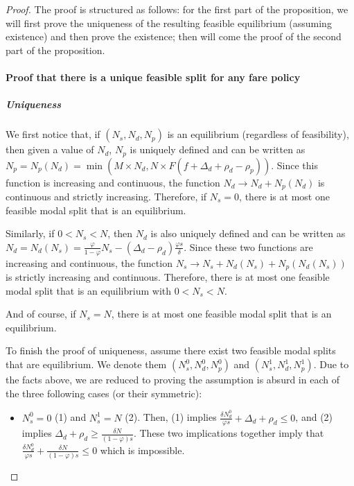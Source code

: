 \documentclass[english, a4paper]{article}
\theoremstyle{plain}
\theoremstyle{definition}
\theoremstyle{remark}
\begin{document}
\begin{proof}
    The proof is structured as follows: for the first part of the proposition, we will first prove the uniqueness of the resulting feasible equilibrium (assuming existence) and then prove the existence; then will come the proof of the second part of the proposition.

    \item \paragraph{Proof that there is a unique feasible split for any fare policy}
    \item \subparagraph{Uniqueness}
    We first notice that, if $(N_s, N_d, N_p)$ is an equilibrium (regardless of feasibility), then given a value of $N_d$, $N_p$ is uniquely defined and can be written as $N_p = N_p(N_d) = \min (M\times N_d, N \times F(f + \Delta _d + \rho _d - \rho _p))$\footnotemark. Since this function is increasing and continuous, the function $N_d \longrightarrow N_d + N_p(N_d)$ is continuous and strictly increasing. Therefore, if $N_s = 0$, there is at most one feasible modal split that is an equilibrium.
    
    Similarly, if $0 < N_s < N$, then $N_d$ is also uniquely defined and can be written as $N_d = N_d (N_s) = \frac{\varphi}{1-\varphi}N_s - (\Delta _d - \rho _d)\frac{\varphi s}{\delta}$. Since these two functions are increasing and continuous, the function $N_s \longrightarrow N_s + N_d(N_s) + N_p(N_d(N_s))$ is strictly increasing and continuous. Therefore, there is at most one feasible modal split that is an equilibrium with $0 < N_s < N$.

    And of course, if $N_s = N$, there is at most one feasible modal split that is an equilibrium.
    

    To finish the proof of uniqueness, assume there exist two feasible modal splits that are equilibrium. We denote them $(N_s^0, N_d^0, N_p^0)$ and $(N_s^1, N_d^1, N_p^1)$. Due to the facts above, we are reduced to proving the assumption is absurd in each of the three following cases (or their symmetric):
    \begin{itemize}
        \item $N_s^0 = 0$ (1) and $N_s^1= N$ (2). Then, (1) implies $\frac{\delta N_d^0}{\varphi s} + \Delta _d + \rho _d \leq 0$, and (2) implies $\Delta _d + \rho _d \geq \frac{\delta N}{(1-\varphi)s}$. These two implications together imply that $\frac{\delta N_d^0}{\varphi s} + \frac{\delta N}{(1-\varphi)s} \leq 0$ which is impossible.


\end{itemize}
\end{proof}
\end{document}

